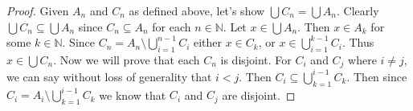 \documentclass[12pt]{article}
\begin{document}
	\begin{proof}
		Given $A_n$ and $C_n$ as defined above, let's show $\bigcup C_n = \bigcup A_n$. Clearly $\bigcup C_n \subseteq \bigcup A_n$ since $C_n \subseteq A_n$ for each $n \in \mathbb{N}$. Let $x \in \bigcup A_n$. Then $x \in A_k$ for some $k \in \mathbb{N}$. Since $C_n = A_n \setminus \bigcup\limits_{i =1}^{n-1}C_i$ either $x \in C_k$, or $x \in \bigcup\limits_{i =1}^{k-1}C_i$. Thus $x \in \bigcup C_n$. \bigbreak
		Now we will prove that each $C_n$ is disjoint. For $C_i$ and $C_j$ where $i \neq j$, we can say without loss of generality that $i<j$. Then $C_i \subseteq \bigcup\limits_{k =1}^{i-1}C_k$. Then since $C_i = A_i \setminus \bigcup\limits_{k =1}^{i-1}C_k$ we know that $C_i$ and $C_j$ are disjoint.
		
	\end{proof}
\end{document}
